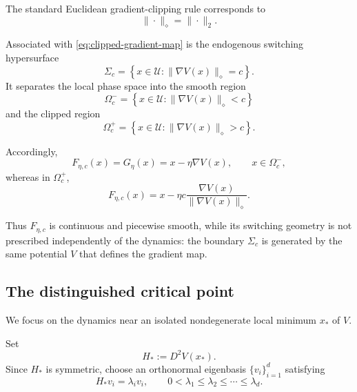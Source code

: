 The standard Euclidean gradient-clipping rule corresponds to
\[
\|\cdot\|_\diamond=\|\cdot\|_2.
\]

Associated with \eqref{eq:clipped-gradient-map} is the endogenous
switching hypersurface
\begin{equation}
\Sigma_c
=
\left\{
x\in\mathcal U:
\|\nabla V(x)\|_\diamond=c
\right\}.
\label{eq:switching-hypersurface}
\end{equation}
It separates the local phase space into the smooth region
\begin{equation}
\Omega_c^-
=
\left\{
x\in\mathcal U:
\|\nabla V(x)\|_\diamond<c
\right\}
\label{eq:smooth-region}
\end{equation}
and the clipped region
\begin{equation}
\Omega_c^+
=
\left\{
x\in\mathcal U:
\|\nabla V(x)\|_\diamond>c
\right\}.
\label{eq:clipped-region}
\end{equation}

Accordingly,
\begin{equation}
F_{\eta,c}(x)
=
G_\eta(x)
=
x-\eta\nabla V(x),
\qquad
x\in\Omega_c^-,
\label{eq:smooth-branch}
\end{equation}
whereas in $\Omega_c^+$,
\begin{equation}
F_{\eta,c}(x)
=
x
-
\eta c
\frac{\nabla V(x)}
{\|\nabla V(x)\|_\diamond}.
\label{eq:clipped-branch}
\end{equation}

Thus $F_{\eta,c}$ is continuous and piecewise smooth, while its
switching geometry is not prescribed independently of the dynamics:
the boundary $\Sigma_c$ is generated by the same potential $V$
that defines the gradient map.

\subsection{The distinguished critical point}
\label{subsec:critical-point}

We focus on the dynamics near an isolated nondegenerate local
minimum $x_*$ of $V$.

Set
\begin{equation}
H_*:=D^2V(x_*).
\label{eq:H-star}
\end{equation}
Since $H_*$ is symmetric, choose an orthonormal eigenbasis
$\{v_i\}_{i=1}^d$ satisfying
\begin{equation}
H_*v_i=\lambda_i v_i,
\qquad
0<\lambda_1\leq\lambda_2\leq\cdots\leq\lambda_d.
\label{eq:H-eigendecomposition}
\end{equation}

